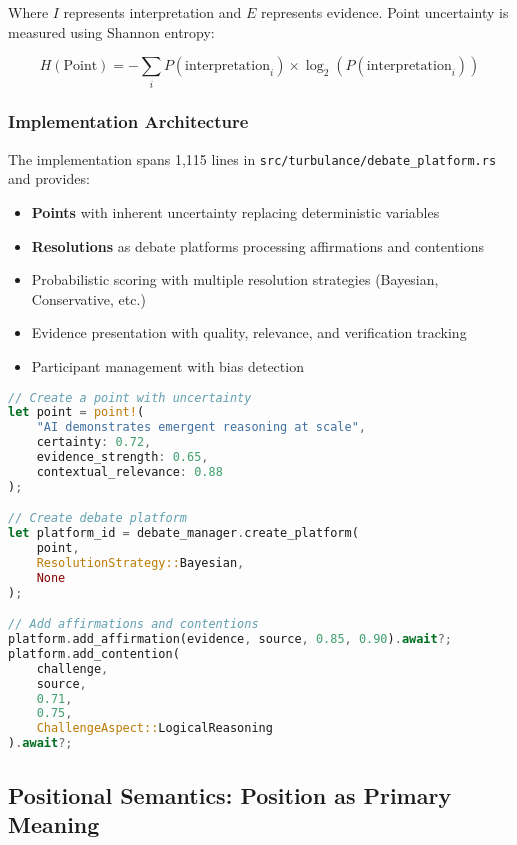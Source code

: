 \documentclass[12pt,a4paper,twoside]{article}
\begin{document}
Where $I$ represents interpretation and $E$ represents evidence. Point uncertainty is measured using Shannon entropy:

\begin{equation}
H(\text{Point}) = -\sum_i P(\text{interpretation}_i) \times \log_2(P(\text{interpretation}_i))
\end{equation}

\subsubsection{Implementation Architecture}

The implementation spans 1,115 lines in \texttt{src/turbulance/debate\_platform.rs} and provides:

\begin{itemize}
\item \textbf{Points} with inherent uncertainty replacing deterministic variables
\item \textbf{Resolutions} as debate platforms processing affirmations and contentions
\item Probabilistic scoring with multiple resolution strategies (Bayesian, Conservative, etc.)
\item Evidence presentation with quality, relevance, and verification tracking
\item Participant management with bias detection
\end{itemize}

\begin{lstlisting}[language=rust,caption=Points and Resolutions Implementation]
// Create a point with uncertainty
let point = point!(
    "AI demonstrates emergent reasoning at scale",
    certainty: 0.72,
    evidence_strength: 0.65,
    contextual_relevance: 0.88
);

// Create debate platform
let platform_id = debate_manager.create_platform(
    point,
    ResolutionStrategy::Bayesian,
    None
);

// Add affirmations and contentions
platform.add_affirmation(evidence, source, 0.85, 0.90).await?;
platform.add_contention(
    challenge,
    source,
    0.71,
    0.75,
    ChallengeAspect::LogicalReasoning
).await?;
\end{lstlisting}

\subsection{Positional Semantics: Position as Primary Meaning}
\end{document}
